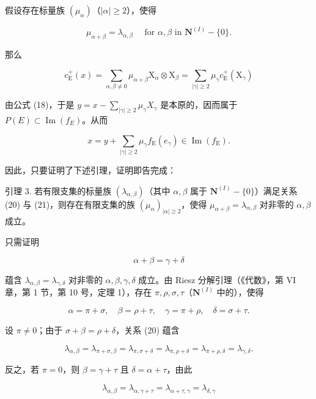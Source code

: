 假设存在标量族 \((\mu_{\alpha})\)（\(|\alpha| \geqslant 2\)），使得

\[
\mu_ {\alpha + \beta} = \lambda_ {\alpha , \beta} \quad \text { for } \alpha , \beta \text { in } \mathbf {N} ^ {(I)} - \{0 \}.\tag{22}
\]

那么

\[
c _ {\mathrm{E}} ^ {+} (x) = \sum_ {\alpha , \beta \neq 0} \mu_ {\alpha + \beta} \mathrm{X} _ {\alpha} \otimes \mathrm{X} _ {\beta} = \sum_ {| \gamma | \geqslant 2} \mu_ {\gamma} c _ {\mathrm{E}} ^ {+} (\mathrm{X} _ {\gamma})
\]

由公式 (18)，于是 \(y = x - \sum_{|\gamma| \geq 2} \mu_\gamma X_\gamma\) 是本原的，因而属于 \(P(E) \subset \operatorname{Im}(f_E)\)。从而

\[
x = y + \sum_ {| \gamma | \geqslant 2} \mu_ {\gamma} f _ {\mathrm{E}} (e _ {\gamma}) \in \operatorname{Im} (f _ {\mathrm{E}}).
\]

因此，只要证明了下述引理，证明即告完成：

引理 3. 若有限支集的标量族 \((\lambda_{\alpha, \beta})\)（其中 \(\alpha, \beta\) 属于 \(\mathbf{N}^{(I)} - \{0\}\)）满足关系 (20) 与 (21)，则存在有限支集的族 \((\mu_{\alpha})_{|\alpha| \geqslant 2}\)，使得 \(\mu_{\alpha + \beta} = \lambda_{\alpha, \beta}\) 对非零的 \(\alpha, \beta\) 成立。

只需证明

\[
\alpha + \beta = \gamma + \delta\tag{23}
\]

蕴含 \(\lambda_{\alpha, \beta} = \lambda_{\gamma, \delta}\) 对非零的 \(\alpha, \beta, \gamma, \delta\) 成立。由 Riesz 分解引理（《代数》，第 VI 章，第 1 节，第 10 号，定理 1），存在 \(\pi, \rho, \sigma, \tau\)（\(\mathbf{N}^{(I)}\) 中的），使得

\[
\alpha = \pi + \sigma , \quad \beta = \rho + \tau , \quad \gamma = \pi + \rho , \quad \delta = \sigma + \tau .
\]

设 \(\pi \neq 0\)；由于 \(\sigma + \beta = \rho + \delta\)，关系 (20) 蕴含

\[
\lambda_ {\alpha , \beta} = \lambda_ {\pi + \sigma , \beta} = \lambda_ {\pi , \sigma + \delta} = \lambda_ {\pi , \rho + \delta} = \lambda_ {\pi + \rho , \delta} = \lambda_ {\gamma , \delta}.
\]

反之，若 \(\pi = 0\)，则 \(\beta = \gamma + \tau\) 且 \(\delta = \alpha + \tau\)，由此

\[
\lambda_ {\alpha , \beta} = \lambda_ {\alpha , \gamma + \tau} = \lambda_ {\alpha + \tau , \gamma} = \lambda_ {\delta , \gamma}
\]

